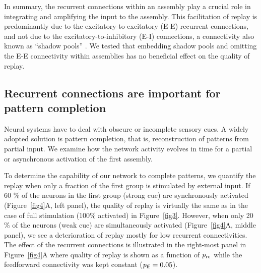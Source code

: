     In summary, the recurrent connections within an assembly play a crucial
    role in integrating and amplifying the input to the assembly. This
    facilitation of replay is predominantly due to the excitatory-to-excitatory
    (E-E) recurrent connections, and not due to the excitatory-to-inhibitory
    (E-I) connections, a connectivity also known as ``shadow pools''
    \citep{Aviel2004}. We tested that embedding shadow pools and omitting the
    E-E connectivity within assemblies has no beneficial effect on the quality
    of replay.

  \subsection{Recurrent connections are important for pattern completion}
    Neural systems have to deal with obscure or incomplete sensory cues.  A
    widely adopted solution is pattern completion, that is, reconstruction of
    patterns from partial input. We examine how the network activity evolves
    in time for a partial or asynchronous activation of the first assembly.

    To determine the capability of our network to complete patterns, we
    quantify the replay when only a fraction of the first group
    is stimulated by external input. If 60 \% of the neurons in the first
    group (strong cue) are synchronously activated (Figure~\ref{fig4}A, left
    panel), the quality of replay is virtually the same as in the case of full
    stimulation (100\% activated) in Figure~\nolinebreak\ref{fig3}.
    However, when only 20 \% of the neurons (weak cue) are simultaneously
    activated (Figure~\ref{fig4}A, middle panel), we see a deterioration of
    replay mostly for low recurrent connectivities. The effect of the
    recurrent connections is illustrated in the right-most panel in
    Figure~\ref{fig4}A where quality of replay is shown as a function of
    $p_{\rm rc}$ while the feedforward connectivity was kept constant ($p_{\rm
    ff}=0.05$).

